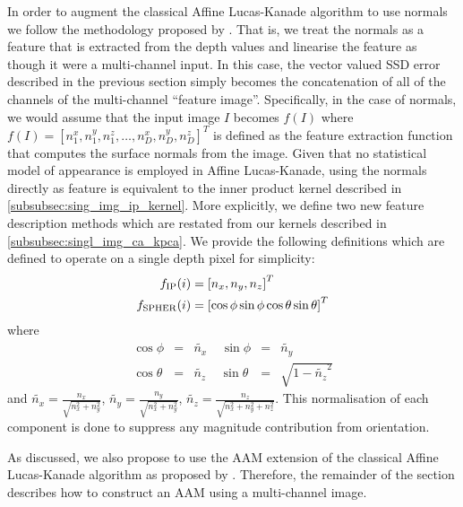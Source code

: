 In order to augment the classical Affine Lucas-Kanade algorithm to use normals
we follow the methodology proposed by \citet{antonakos2015feature}. That is,
we treat the normals as a feature that is extracted from the depth values
and linearise the feature as though it were a multi-channel input. In this case,
the vector valued SSD error described in the previous section simply
becomes the concatenation of all of the channels of the multi-channel
``feature image''. Specifically, in the case of normals, we would assume
that the input image $I$ becomes $f(I)$ where
$f(I) = {[n^x_1, n^y_1, n^z_1, \ldots, n^x_D, n^y_D, n^z_D]}^T$ is defined as 
the feature extraction function that computes the surface normals from the 
image. Given that no statistical model of appearance is employed in Affine
Lucas-Kanade, using the normals directly as feature is equivalent to
the inner product kernel described in \cref{subsubsec:sing_img_ip_kernel}.
More explicitly, we define two new feature description methods which are
restated from our kernels described in \cref{subsubsec:singl_img_ca_kpca}.
We provide the following definitions which are defined to operate on a single
depth pixel for simplicity:
\begin{equation}
    \begin{aligned}\label{eq:normal_feature_functions}
        f_{\operatorname{IP}}(i)    &= {[n_x, n_y, n_z]}^T \\
        f_{\operatorname{SPHER}}(i) &= {[\cos \phi \sin \phi \cos \theta \sin \theta]}^T
    \end{aligned}
\end{equation}
where
\begin{equation}
    \begin{aligned}\label{eq:normalised-spherical}
        \cos \phi   &=& \tilde{n_x} \;\;\;\; \sin \phi   &=& \tilde{n_y} \\
        \cos \theta &=& \tilde{n_z} \;\;\;\; \sin \theta &=& \sqrt{1 - {\tilde{n_z}}^2}
    \end{aligned}
\end{equation}
and $\tilde{n_x} = \frac{n_x}{\sqrt{n_x^2 + n_y^2}}$,
$\tilde{n_y} = \frac{n_y}{\sqrt{n_x^2 + n_y^2}}$,
$\tilde{n_z} = \frac{n_z}{\sqrt{n_x^2 + n_y^2 + n_z^2}}$. 
This normalisation of each component is done to suppress any magnitude
contribution from orientation.

As discussed, we also propose to use the AAM extension of the classical 
Affine Lucas-Kanade algorithm as proposed by \citet{matthews2004active}.
Therefore, the remainder of the section describes how to construct an AAM
using a multi-channel image.
